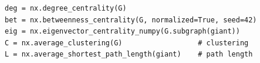 \begin{lstlisting}[style=python]
deg = nx.degree_centrality(G)
bet = nx.betweenness_centrality(G, normalized=True, seed=42)
eig = nx.eigenvector_centrality_numpy(G.subgraph(giant))
C = nx.average_clustering(G)                  # clustering
L = nx.average_shortest_path_length(giant)    # path length
\end{lstlisting}
